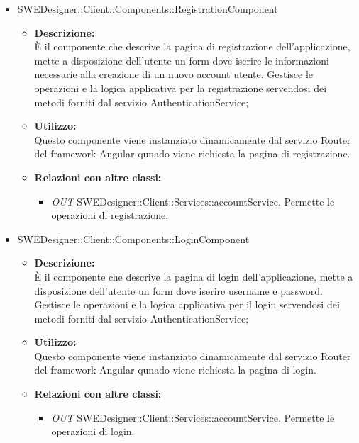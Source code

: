 \begin{itemize}
			\item SWEDesigner::Client::Components::RegistrationComponent
			\begin{itemize}
				\item \textbf{Descrizione: }\\
				È il componente che descrive la pagina di registrazione dell'applicazione,
				mette a disposizione dell'utente un form dove iserire le informazioni
				necessarie alla creazione di un nuovo account utente. Gestisce le
				operazioni e la logica applicativa per la registrazione servendosi dei
				metodi forniti dal servizio AuthenticationService;
				\item \textbf{Utilizzo: }\\
				Questo componente viene instanziato dinamicamente dal servizio Router del
				 framework Angular qunado viene richiesta la pagina di registrazione.
				 \item \textbf{Relazioni con altre classi: }
				\begin{itemize}
				\item \emph{OUT} SWEDesigner::Client::Services::accountService. Permette le operazioni di registrazione.
				\end{itemize}
			\end{itemize}
			\item SWEDesigner::Client::Components::LoginComponent
			\begin{itemize}
				\item \textbf{Descrizione: }\\
				È il componente che descrive la pagina di login dell'applicazione,
				mette a disposizione dell'utente un form dove iserire username e password.
				Gestisce le operazioni e la logica applicativa per il login servendosi dei
				metodi forniti dal servizio AuthenticationService;
				\item \textbf{Utilizzo: }\\
				Questo componente viene instanziato dinamicamente dal servizio Router del
				framework Angular qunado viene richiesta la pagina di login.
				\item \textbf{Relazioni con altre classi: }
				\begin{itemize}
				\item \emph{OUT} SWEDesigner::Client::Services::accountService. Permette le operazioni di login.
				\end{itemize}
			\end{itemize}
		\end{itemize}

